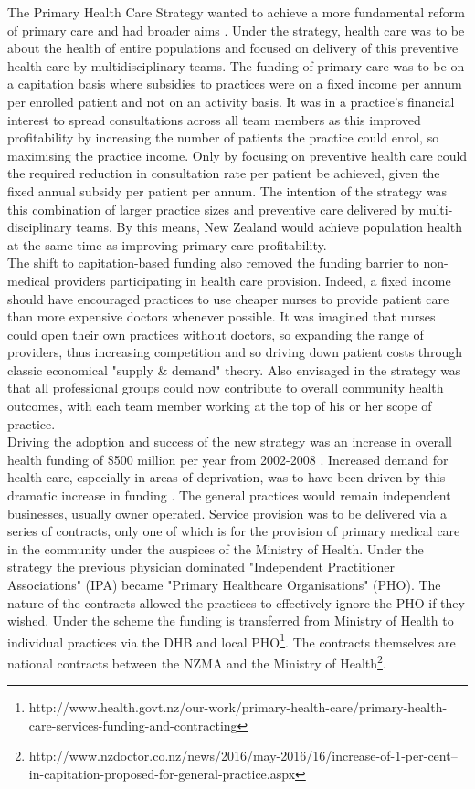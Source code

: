 \documentclass[11pt,a4paper]{article}
\begin{document}
The Primary Health Care Strategy wanted to achieve a more fundamental reform of primary care and had broader aims \citep{king2001primary}. Under the strategy, health care was to be about the health of entire populations and focused on delivery of  this preventive health care by multidisciplinary teams. The funding of primary care was to be on a capitation basis where subsidies to practices were on a fixed income per annum per enrolled patient and not on an activity basis. It was in a practice's financial interest to spread consultations across all team members as this improved profitability by increasing the number of patients the practice could enrol, so maximising the practice income. Only by focusing on preventive health care could the required reduction in consultation rate per patient be achieved, given the fixed annual subsidy per patient per annum. The intention of the strategy was this combination of larger practice sizes and preventive care delivered by multi-disciplinary teams. By this means, New Zealand would achieve population health at the same time as improving primary care profitability\citep{king2001primary}.\\


The shift to capitation-based funding also removed the funding barrier to non-medical providers participating in health care provision. Indeed, a fixed income should have encouraged practices to use cheaper nurses to provide patient care than more expensive doctors whenever possible. It was imagined that nurses could open their own practices without doctors, so expanding the range of providers, thus increasing competition and so driving down patient costs through classic economical "supply \& demand" theory. Also envisaged in the strategy was that all professional groups could now contribute to overall community health outcomes, with each team member working at the top of his or her scope of practice.\\


Driving the adoption and success of the new strategy was an increase in overall health funding of \$500 million per year from 2002-2008 \citep{gauld2006new}. Increased demand for health care, especially in areas of deprivation, was to have been driven by this dramatic increase in funding \citep{king2001primary}. The general practices would remain independent businesses, usually owner operated. Service provision was to be delivered via a series of contracts, only one of which is for the provision of primary medical care in the community under the auspices of the Ministry of Health. Under the strategy the previous physician dominated "Independent Practitioner Associations" (IPA) became "Primary Healthcare Organisations" (PHO). The nature of the contracts allowed the practices to effectively ignore the PHO if they wished. Under the scheme the funding is transferred from Ministry of Health to individual practices via the DHB and local PHO\footnote{http://www.health.govt.nz/our-work/primary-health-care/primary-health-care-services-funding-and-contracting}. The contracts themselves are national contracts between the NZMA and the Ministry of Health\footnote{http://www.nzdoctor.co.nz/news/2016/may-2016/16/increase-of-1-per-cent--in-capitation-proposed-for-general-practice.aspx}.\\
\end{document}
